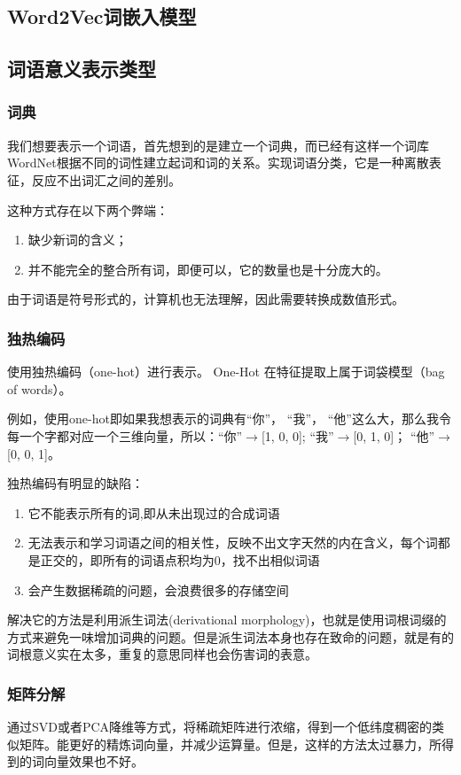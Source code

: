 \documentclass[12pt]{article}
\begin{document}
\subsection{Word2Vec词嵌入模型}
\subsection{词语意义表示类型}
\subsubsection{词典}
我们想要表示一个词语，首先想到的是建立一个词典，而已经有这样一个词库WordNet根据不同的词性建立起词和词的关系。实现词语分类，它是一种离散表征，反应不出词汇之间的差别。\par
这种方式存在以下两个弊端：
\begin{enumerate}
\item 缺少新词的含义；
\item 并不能完全的整合所有词，即便可以，它的数量也是十分庞大的。
\end{enumerate}

由于词语是符号形式的，计算机也无法理解，因此需要转换成数值形式。
\subsubsection{独热编码}
使用独热编码（one-hot）进行表示。 One-Hot 在特征提取上属于词袋模型（bag of words）。\par
例如，使用one-hot即如果我想表示的词典有{“你”， “我”， “他”}这么大，那么我令每一个字都对应一个三维向量，所以：“你”$\rightarrow$[1, 0, 0]; “我”$\rightarrow$[0, 1, 0]； “他”$\rightarrow$[0, 0, 1]。\par
 独热编码有明显的缺陷：
 \begin{enumerate}
\item 它不能表示所有的词,即从未出现过的合成词语
\item 无法表示和学习词语之间的相关性，反映不出文字天然的内在含义，每个词都是正交的，即所有的词语点积均为0，找不出相似词语
\item 会产生数据稀疏的问题，会浪费很多的存储空间
\end{enumerate}

解决它的方法是利用派生词法(derivational morphology)，也就是使用词根词缀的方式来避免一味增加词典的问题。但是派生词法本身也存在致命的问题，就是有的词根意义实在太多，重复的意思同样也会伤害词的表意。
\subsubsection{矩阵分解}
通过SVD或者PCA降维等方式，将稀疏矩阵进行浓缩，得到一个低纬度稠密的类似矩阵。能更好的精炼词向量，并减少运算量。但是，这样的方法太过暴力，所得到的词向量效果也不好。
\end{document}
